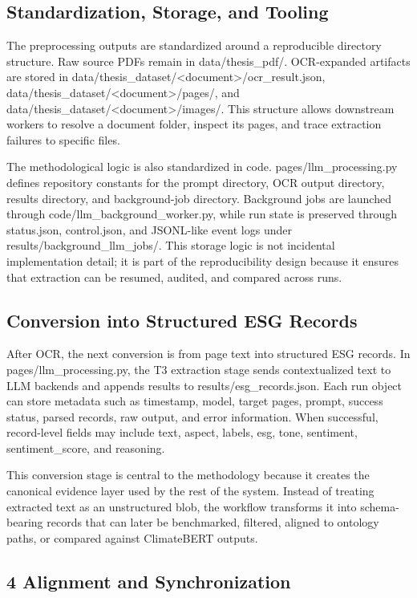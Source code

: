 \subsection{Standardization, Storage, and Tooling}

The preprocessing outputs are standardized around a reproducible directory structure. Raw source PDFs remain in data/thesis\_pdf/. OCR-expanded artifacts are stored in data/thesis\_dataset/<document>/ocr\_result.json, data/thesis\_dataset/<document>/pages/, and data/thesis\_dataset/<document>/images/. This structure allows downstream workers to resolve a document folder, inspect its pages, and trace extraction failures to specific files.

The methodological logic is also standardized in code. pages/llm\_processing.py defines repository constants for the prompt directory, OCR output directory, results directory, and background-job directory. Background jobs are launched through code/llm\_background\_worker.py, while run state is preserved through status.json, control.json, and JSONL-like event logs under results/background\_llm\_jobs/. This storage logic is not incidental implementation detail; it is part of the reproducibility design because it ensures that extraction can be resumed, audited, and compared across runs.

\subsection{Conversion into Structured ESG Records}

After OCR, the next conversion is from page text into structured ESG records. In pages/llm\_processing.py, the T3 extraction stage sends contextualized text to LLM backends and appends results to results/esg\_records.json. Each run object can store metadata such as timestamp, model, target pages, prompt, success status, parsed records, raw output, and error information. When successful, record-level fields may include text, aspect, labels, esg, tone, sentiment, sentiment\_score, and reasoning.

This conversion stage is central to the methodology because it creates the canonical evidence layer used by the rest of the system. Instead of treating extracted text as an unstructured blob, the workflow transforms it into schema-bearing records that can later be benchmarked, filtered, aligned to ontology paths, or compared against ClimateBERT outputs.

\subsection{4 Alignment and Synchronization}

